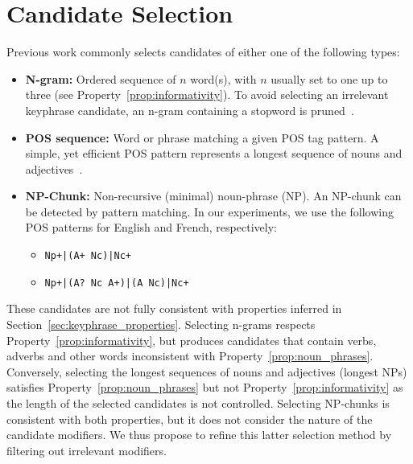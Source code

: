 \section{Candidate Selection}
\label{sec:candidate_selection}
    Previous work commonly selects candidates of either one of the following types:
    \begin{itemize}
        \item{\textbf{N-gram:} Ordered sequence of $n$ word(s), with $n$ usually set to one up to three (see Property~\ref{prop:informativity}).
              To avoid selecting an irrelevant keyphrase candidate, an n-gram containing a stopword is pruned~\cite{witten1999kea}.}
          
        \item{\textbf{POS sequence:} Word or phrase matching a given POS tag pattern. A simple, yet efficient POS pattern represents a longest sequence of nouns and adjectives~\cite{bougouin2013topicrank}.}
        \item{\textbf{NP-Chunk:} Non-recursive (minimal) noun-phrase (NP). An
              NP-chunk can be detected by pattern matching. In our experiments, we use the following POS patterns for English and French, respectively:}
            \begin{itemize}
                \item{\texttt{Np+|(A+~Nc)|Nc+}}
                \item{\texttt{Np+|(A?~Nc~A+)|(A~Nc)|Nc+}}
            \end{itemize}
    \end{itemize}
  
    These candidates are not fully consistent with properties inferred in Section~\ref{sec:keyphrase_properties}.
    Selecting n-grams respects Property~\ref{prop:informativity}, but produces candidates that contain verbs, adverbs and other words inconsistent with Property~\ref{prop:noun_phrases}.
    Conversely, selecting the longest sequences of nouns and adjectives (longest NPs) satisfies Property~\ref{prop:noun_phrases} but not Property~\ref{prop:informativity} as the length of the selected candidates is not controlled.
    Selecting NP-chunks is consistent with both properties, but it does not consider the nature of the candidate modifiers.
    We thus propose to refine this latter selection method by filtering out irrelevant modifiers.
  